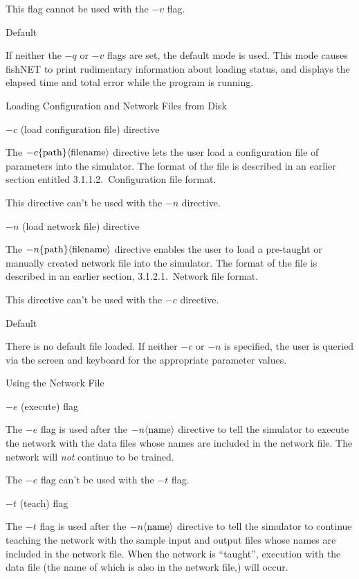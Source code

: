 This flag cannot be used with the $-v$ flag.

\ssssec Default

If neither the $-q$ or $-v$ flags are set, the default mode is used.
This mode causes fishNET to print rudimentary information 
about loading status, and
displays the elapsed time and total error while the program is
running.

\sssec Loading Configuration and Network Files from Disk

\ssssec $-c$ (load configuration file) directive

The $-c\{{\rm path}\}\langle{\rm file name}\rangle$ directive lets
the user load a configuration file of parameters into the simulator.
The format of the file is described in an earlier section entitled
3.1.1.2.~Configuration file format.

This directive can't be used with the $-n$ directive.

\ssssec $-n$ (load network file) directive

The $-n\{{\rm path}\}\langle{\rm file name}\rangle$ directive enables
the user to load a pre-taught or manually created network file into the
simulator.
The format of the file is described in an earlier section, 
3.1.2.1.~Network file format.

This directive can't be used with the $-c$ directive.

\ssssec Default

There is no default file loaded.
If neither $-c$ or $-n$ is specified, the user is queried via the
screen and keyboard for the appropriate parameter values.

\sssec Using the Network File

\ssssec $-e$ (execute) flag

The $-e$ flag is used after the $-n\langle{\rm name}\rangle$
directive to tell the simulator to execute the network with the data
files whose names are included in the network file.
The network will {\sl not} continue to be trained.

The $-e$ flag can't be used with the $-t$ flag.

\ssssec $-t$ (teach) flag

The $-t$ flag is used after the $-n\langle{\rm name}\rangle$
directive to tell the simulator to continue teaching the network
with the sample input and output files whose names are included in
the network file.
When the network is ``taught'', execution with the data file (the
name of which is also in the network file,) will occur.

